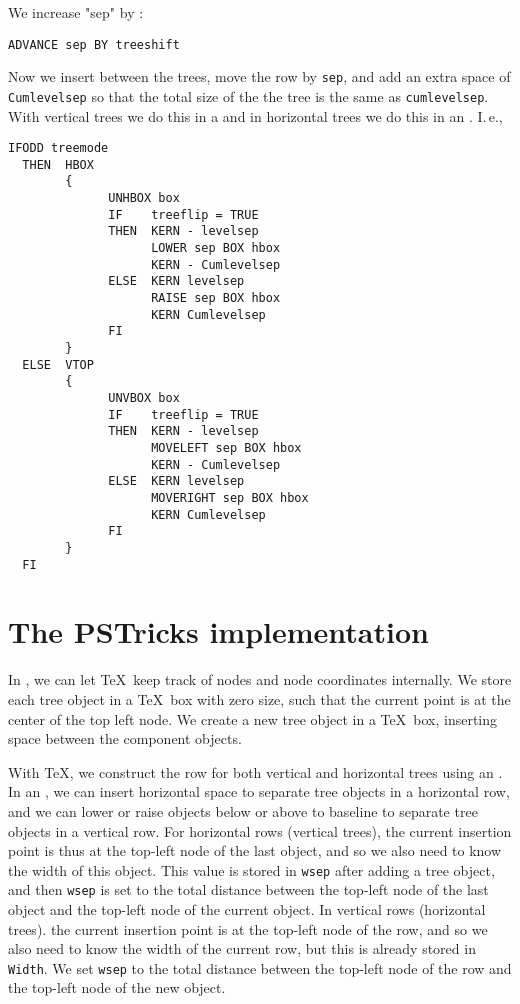 \documentclass[11pt,english,BCOR10mm,DIV12,bibliography=totoc,parskip=false,smallheadings
    headexclude,footexclude,oneside]{pst-doc}
\begin{document}
We increase "sep" by :
\begin{lstlisting}[style=syntax]
  ADVANCE sep BY treeshift
\end{lstlisting}

Now we insert  between the trees, move the row by \verb=sep=, and add an extra space of 
\verb=Cumlevelsep= so that the total size of the the tree is the same as \verb=cumlevelsep=.  With vertical 
trees we do this in a  and in horizontal trees we do this in an . I.\,e.,
\begin{lstlisting}[style=syntax]
  IFODD treemode
  THEN  HBOX
        {
              UNHBOX box
              IF    treeflip = TRUE
              THEN  KERN - levelsep
                    LOWER sep BOX hbox
                    KERN - Cumlevelsep
              ELSE  KERN levelsep
                    RAISE sep BOX hbox
                    KERN Cumlevelsep
              FI
        }
  ELSE  VTOP
        {
              UNVBOX box
              IF    treeflip = TRUE
              THEN  KERN - levelsep
                    MOVELEFT sep BOX hbox
                    KERN - Cumlevelsep
              ELSE  KERN levelsep
                    MOVERIGHT sep BOX hbox
                    KERN Cumlevelsep
              FI
        }
  FI
\end{lstlisting}


\section{The PSTricks implementation}

In , we can let \TeX\ keep track of nodes and node coordinates internally. We store each 
tree object in a \TeX\ box with zero size, such that the current point is at the center of the top 
left node. We create a new tree object in a \TeX\ box, inserting space between the component objects.

With \TeX, we construct the row for both vertical and horizontal trees using an . In an , 
we can insert horizontal space to separate tree objects in a horizontal row, and we can lower or raise 
objects below or above to baseline to separate tree objects in a vertical row. For horizontal rows 
(vertical trees), the current insertion point is thus at the top-left node of the last object, and 
so we also need to know the width of this object. This value is stored in \verb=wsep= after adding a tree 
object, and then \verb=wsep= is set to the total distance between the top-left node of the last object and 
the top-left node of the current object. In vertical rows (horizontal trees). the current insertion 
point is at the top-left node of the row, and so we also need to know the width of the current row, 
but this is already stored in \verb=Width=. We set \verb=wsep= to the total distance between the top-left node 
of the row and the top-left node of the new object.
\end{document}
